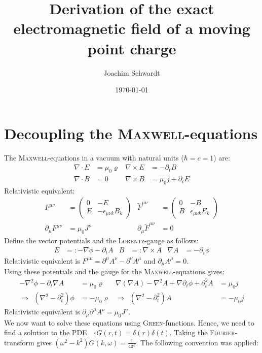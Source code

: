 \documentclass[a4paper,12pt]{article}
\newcommand{\kla}{}
\begin{document}
\title{Derivation of the exact electromagnetic field of a moving point charge}
\author{Joachim Schwardt}
\date{\today}
\maketitle

\section{Decoupling the \textsc{Maxwell}-equations}
The \textsc{Maxwell}-equations in a vacuum with natural units ($\hbar=c=1$) are:
\begin{align*}
\nabla\cdot E&=\mu_0\varrho&\nabla\times E&=-\partial_tB\\
\nabla\cdot B&=0&\nabla\times B&=\mu_0j+\partial_tE
\end{align*}
Relativistic equivalent:
\begin{align*}
F^{\mu\nu}&=\begin{pmatrix}
0&-E \\ E & -\epsilon_{\mu\nu k}B_k
\end{pmatrix}&\widetilde{F}^{\mu\nu}&=\begin{pmatrix}
0&-B \\ B & \epsilon_{\mu\nu k}E_k
\end{pmatrix} \\
\partial_\mu F^{\mu\nu}&=\mu_0J^\nu&\partial_\mu\widetilde{F}^{\mu\nu}&=0
\end{align*}
Define the vector potentials and the \textsc{Lorentz}-gauge as follows:
\begin{align*}
E&=:-\nabla\phi-\partial_t A&B&=:\nabla\times A &\nabla A&=-\partial_t\phi
\end{align*}
Relativistic equivalent is $F^{\mu\nu}=\partial^\mu A^\nu -\partial^\nu A^\mu$ and $\partial_\mu A^\mu =0$.\\
Using these potentials and the gauge for the \textsc{Maxwell}-equations gives:
\begin{align*}
-\nabla^2\phi -\partial_t\nabla A&=\mu_0\varrho&\nabla(\nabla A)-\nabla^2 A+\nabla\partial_t\phi+\partial_t^2A&=\mu_0j\\
\Rightarrow\ \ \kla\left( {\nabla^2-\partial_t^2} \right)\phi&=-\mu_0\varrho &\Rightarrow\ \ \kla\left( {\nabla^2-\partial_t^2} \right)A&=-\mu_0j
\end{align*}
Relativistic equivalent is $\partial_\mu\partial^\mu A^\nu =\mu_0J^\nu$.\\
We now want to solve these equations using \textsc{Green}-functions. Hence, we need to find a solution to the PDE\ \ $\square G(r,t)=\delta(r)\delta(t)$. Taking the \textsc{Fourier}-transform gives $\kla\left( {\omega^2-k^2} \right)G(k,\omega)=\frac{1}{4\pi^2}$. The following convention was applied:
\end{document}
